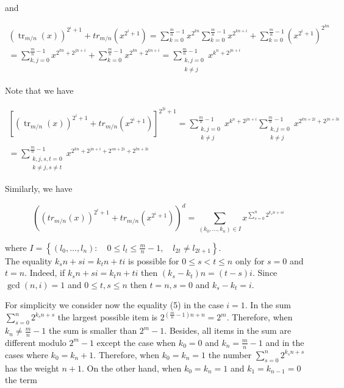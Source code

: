 \documentclass[10pt]{article}
\begin{document}
and

$$
\begin{gathered}
\left(\operatorname{tr}_{m / n}(x)\right)^{2^{i}+1}+t r_{m / n}\left(x^{2^{i}+1}\right)=\sum_{k=0}^{\frac{m}{n}-1} x^{2^{k n}} \sum_{k=0}^{\frac{m}{n}-1} x^{2^{k n+i}}+\sum_{k=0}^{\frac{m}{n}-1}\left(x^{2^{i}+1}\right)^{2^{k n}} \\
=\sum_{k, j=0}^{\frac{m}{n}-1} x^{2^{k n}+2^{j n+i}}+\sum_{k=0}^{\frac{m}{n}-1} x^{2^{k n}+2^{k n+i}}=\sum_{\substack{k, j=0 \\
k \neq j}}^{\frac{m}{n}-1} x^{k^{n}+2^{j n+i}}
\end{gathered}
$$

Note that we have

$$
\begin{gathered}
{\left[\left(\operatorname{tr}_{m / n}(x)\right)^{2^{i}+1}+t r_{m / n}\left(x^{2^{i}+1}\right)\right]^{2^{2 i}+1}=\sum_{\substack{k, j=0 \\
k \neq j}}^{\frac{m}{n}-1} x^{k^{n}+2^{j n+i}} \sum_{\substack{k, j=0 \\
k \neq j}}^{\frac{m}{n}-1} x^{2^{k n+2 i}+2^{j n+3 i}}} \\
=\sum_{\substack{k, j, s, t=0 \\
k \neq j, s \neq t}}^{\frac{m}{n}-1} x^{2^{k n}+2^{j n+i}+2^{s n+2 i}+2^{t n+3 i}}
\end{gathered}
$$

Similarly, we have


\begin{equation*}
\left(\left(t r_{m / n}(x)\right)^{2^{i}+1}+t r_{m / n}\left(x^{2^{i}+1}\right)\right)^{d}=\sum_{\left(k_{0}, \ldots, k_{n}\right) \in I} x^{\sum_{s=0}^{n} 2^{k_{s} n+s i}} \tag{5}
\end{equation*}


where $I=\left\{\left(l_{0}, \ldots, l_{n}\right): \quad 0 \leq l_{t} \leq \frac{m}{n}-1, \quad l_{2 t} \neq l_{2 t+1}\right\}$.\\
The equality $k_{s} n+s i=k_{t} n+t i$ is possible for $0 \leq s<t \leq n$ only for $s=0$ and $t=n$. Indeed, if $k_{s} n+s i=k_{t} n+t i$ then $\left(k_{s}-k_{t}\right) n=(t-s) i$. Since $\operatorname{gcd}(n, i)=1$ and $0 \leq t, s \leq n$ then $t=n, s=0$ and $k_{s}-k_{t}=i$.

For simplicity we consider now the equality (5) in the case $i=1$. In the sum $\sum_{s=0}^{n} 2^{k_{s} n+s}$ the largest possible item is $2^{\left(\frac{m}{n}-1\right) n+n}=2^{m}$. Therefore, when $k_{n} \neq \frac{m}{n}-1$ the sum is smaller than $2^{m}-1$. Besides, all items in the sum are different modulo $2^{m}-1$ except the case when $k_{0}=0$ and $k_{n}=\frac{m}{n}-1$ and in the cases where $k_{0}=k_{n}+1$. Therefore, when $k_{0}=k_{n}=1$ the number $\sum_{s=0}^{n} 2^{k_{s} n+s}$ has the weight $n+1$. On the other hand, when $k_{0}=k_{n}=1$ and $k_{1}=k_{n-1}=0$ the term
\end{document}
